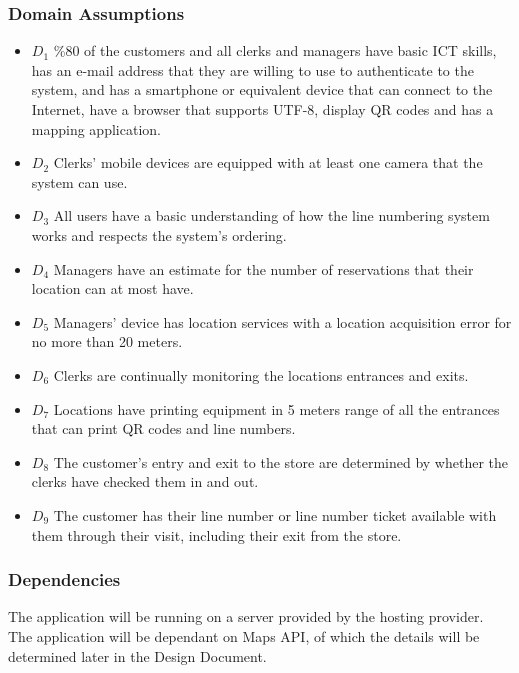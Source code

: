 \subsubsection{Domain Assumptions}

\begin{itemize}
    \item \textbf{$D_1$} \%80 of the customers and all clerks and managers have basic ICT skills, has an e-mail address that they are willing to use to authenticate to the system, and has a smartphone or equivalent device that can connect to the Internet, have a browser that supports UTF-8, display QR codes and has a mapping application.
    \item \textbf{$D_2$} Clerks' mobile devices are equipped with at least one camera that the system can use.
    \item \textbf{$D_3$} All users have a basic understanding of how the line numbering system works and respects the system's ordering.
    \item \textbf{$D_4$} Managers have an estimate for the number of reservations that their location can at most have.
    \item \textbf{$D_5$} Managers' device has location services with a location acquisition error for no more than 20 meters.
    \item \textbf{$D_6$} Clerks are continually monitoring the locations entrances and exits.
    \item \textbf{$D_7$} Locations have printing equipment in 5 meters range of all the entrances that can print QR codes and line numbers.
    \item \textbf{$D_8$} The customer's entry and exit to the store are determined by whether the clerks have checked them in and out.
    \item \textbf{$D_9$} The customer has their line number or line number ticket available with them through their visit, including their exit from the store.
\end{itemize}

\subsubsection{Dependencies}

The application will be running on a server provided by the hosting provider.
The application will be dependant on Maps API, of which the details will be determined later in the Design Document.

